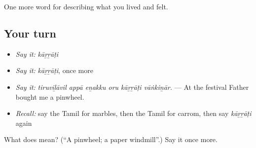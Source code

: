 \begin{grammarlens}[title={What you've built}]
One more word for describing what you lived and felt.
\end{grammarlens}

\subsection*{Your turn}
\begin{itemize}
\raggedright
  \item \emph{Say it:} \emph{kāṟṟāṭi}
  \item \emph{Say it:} \emph{kāṟṟāṭi}, once more
  \item \emph{Say it:} \emph{tiruviḻāvil appā eṉakku oru kāṟṟāṭi vāṅkiṉār.} — At the festival Father bought me a pinwheel.
  \item \emph{Recall:} say the Tamil for marbles, then the Tamil for carrom, then say \emph{kāṟṟāṭi} again
\end{itemize}

\begin{tcolorbox}[breakable,colback=teal!4,colframe=teal!35!black,title={Before you move on}]
What does  mean? (\textquotedblleft{}A pinwheel; a paper windmill\textquotedblright{}.) Say it once more.
\end{tcolorbox}
